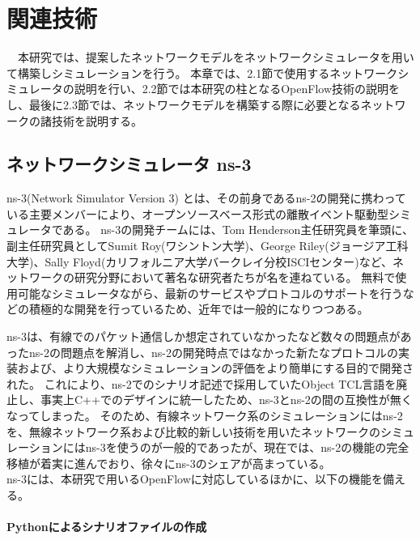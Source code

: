 \chapter{関連技術}

　本研究では、提案したネットワークモデルをネットワークシミュレータを用いて構築しシミュレーションを行う。
本章では、2.1節で使用するネットワークシミュレータの説明を行い、2.2節では本研究の柱となるOpenFlow技術の説明をし、最後に2.3節では、ネットワークモデルを構築する際に必要となるネットワークの諸技術を説明する。

\section{ネットワークシミュレータ ns-3}

ns-3(Network Simulator Version 3)\cite{ns3} \cite{ns3text} とは、その前身であるns-2の開発に携わっている主要メンバーにより、オープンソースベース形式の離散イベント駆動型シミュレータである。
ns-3の開発チームには、Tom Henderson主任研究員を筆頭に、副主任研究員としてSumit Roy(ワシントン大学)、George Riley(ジョージア工科大学)、Sally Floyd(カリフォルニア大学バークレイ分校ISCIセンター)など、ネットワークの研究分野において著名な研究者たちが名を連ねている。
無料で使用可能なシミュレータながら、最新のサービスやプロトコルのサポートを行うなどの積極的な開発を行っているため、近年では一般的になりつつある。

ns-3は、有線でのパケット通信しか想定されていなかったなど数々の問題点があったns-2の問題点を解消し、ns-2の開発時点ではなかった新たなプロトコルの実装および、より大規模なシミュレーションの評価をより簡単にする目的で開発された。
これにより、ns-2でのシナリオ記述で採用していたObject TCL言語を廃止し、事実上C++でのデザインに統一したため、ns-3とns-2の間の互換性が無くなってしまった。
そのため、有線ネットワーク系のシミュレーションにはns-2を、無線ネットワーク系および比較的新しい技術を用いたネットワークのシミュレーションにはns-3を使うのが一般的であったが、現在では、ns-2の機能の完全移植が着実に進んでおり、徐々にns-3のシェアが高まっている。 \\

ns-3には、本研究で用いるOpenFlowに対応しているほかに、以下の機能を備える。

\subsubsection{Pythonによるシナリオファイルの作成}

